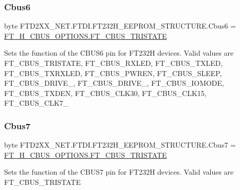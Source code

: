 \subsubsection{\texorpdfstring{Cbus6}{Cbus6}}
{\footnotesize\ttfamily byte F\+T\+D2\+X\+X\+\_\+\+N\+E\+T.\+F\+T\+D\+I.\+F\+T232\+H\+\_\+\+E\+E\+P\+R\+O\+M\+\_\+\+S\+T\+R\+U\+C\+T\+U\+R\+E.\+Cbus6 = \mbox{\hyperlink{class_f_t_d2_x_x___n_e_t_1_1_f_t_d_i_1_1_f_t__232_h___c_b_u_s___o_p_t_i_o_n_s_a87f6bc339ec2e6bbb3ad093eb9d38278}{F\+T\+\_\+H\+\_\+\+C\+B\+U\+S\+\_\+\+O\+P\+T\+I\+O\+N\+S.\+F\+T\+\_\+\+C\+B\+U\+S\+\_\+\+T\+R\+I\+S\+T\+A\+TE}}}



Sets the function of the C\+B\+U\+S6 pin for F\+T232H devices. Valid values are F\+T\+\_\+\+C\+B\+U\+S\+\_\+\+T\+R\+I\+S\+T\+A\+TE, F\+T\+\_\+\+C\+B\+U\+S\+\_\+\+R\+X\+L\+ED, F\+T\+\_\+\+C\+B\+U\+S\+\_\+\+T\+X\+L\+ED, F\+T\+\_\+\+C\+B\+U\+S\+\_\+\+T\+X\+R\+X\+L\+ED, F\+T\+\_\+\+C\+B\+U\+S\+\_\+\+P\+W\+R\+EN, F\+T\+\_\+\+C\+B\+U\+S\+\_\+\+S\+L\+E\+EP, F\+T\+\_\+\+C\+B\+U\+S\+\_\+\+D\+R\+I\+V\+E\+\_, F\+T\+\_\+\+C\+B\+U\+S\+\_\+\+D\+R\+I\+V\+E\+\_, F\+T\+\_\+\+C\+B\+U\+S\+\_\+\+I\+O\+M\+O\+DE, F\+T\+\_\+\+C\+B\+U\+S\+\_\+\+T\+X\+D\+EN, F\+T\+\_\+\+C\+B\+U\+S\+\_\+\+C\+L\+K30, F\+T\+\_\+\+C\+B\+U\+S\+\_\+\+C\+L\+K15, F\+T\+\_\+\+C\+B\+U\+S\+\_\+\+C\+L\+K7\+\_ 

\mbox{\label{class_f_t_d2_x_x___n_e_t_1_1_f_t_d_i_1_1_f_t232_h___e_e_p_r_o_m___s_t_r_u_c_t_u_r_e_acf77d77fd673c96ed77b8a0f0be968d3}} 
\subsubsection{\texorpdfstring{Cbus7}{Cbus7}}
{\footnotesize\ttfamily byte F\+T\+D2\+X\+X\+\_\+\+N\+E\+T.\+F\+T\+D\+I.\+F\+T232\+H\+\_\+\+E\+E\+P\+R\+O\+M\+\_\+\+S\+T\+R\+U\+C\+T\+U\+R\+E.\+Cbus7 = \mbox{\hyperlink{class_f_t_d2_x_x___n_e_t_1_1_f_t_d_i_1_1_f_t__232_h___c_b_u_s___o_p_t_i_o_n_s_a87f6bc339ec2e6bbb3ad093eb9d38278}{F\+T\+\_\+H\+\_\+\+C\+B\+U\+S\+\_\+\+O\+P\+T\+I\+O\+N\+S.\+F\+T\+\_\+\+C\+B\+U\+S\+\_\+\+T\+R\+I\+S\+T\+A\+TE}}}



Sets the function of the C\+B\+U\+S7 pin for F\+T232H devices. Valid values are F\+T\+\_\+\+C\+B\+U\+S\+\_\+\+T\+R\+I\+S\+T\+A\+TE 

